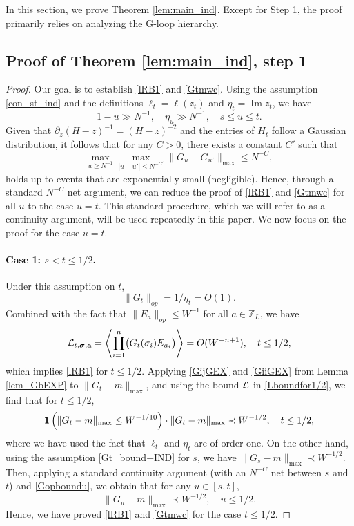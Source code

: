 \documentclass[10pt,reqno]{article}
\DeclareMathOperator{\im}{{\mathrm{Im}}}
\theoremstyle{plain} %
\theoremstyle{remark}
\numberwithin{equation}{section}
\begin{document}
In this section, we prove Theorem \ref{lem:main_ind}. Except for Step 1, the proof primarily relies on analyzing the G-loop hierarchy.

\subsection{Proof of Theorem \ref{lem:main_ind}, step 1}

\begin{proof}

Our goal is to establish \eqref{lRB1} and \eqref{Gtmwc}. Using the assumption \eqref{con_st_ind} and the definitions \(\ell_t = \ell(z_t)\) and \(\eta_t = \im z_t\), we have 
$$
1 - u \gg N^{-1}, \quad \eta_u \gg N^{-1}, \quad s\le u\le t.
$$
Given that \(\partial_z (H - z)^{-1} = (H - z)^{-2}\) and the entries of \(H_t\) follow a Gaussian distribution, it follows that for any \(C > 0\), there exists a constant \(C'\) such that 
\begin{equation}\label{Gopboundu}
    \max_{u \ge N^{-1}} \max_{|u - u'| \leq N^{-C'}} \| G_u - G_{u'} \|_{\max} \leq N^{-C},
\end{equation}
holds up to events that are exponentially small (negligible). Hence, through a standard \(N^{-C}\) net argument, we can reduce the proof of \eqref{lRB1} and \eqref{Gtmwc} for all \(u\) to the case \(u = t\). This standard procedure, which we will refer to as a continuity argument, will be used repeatedly in this paper. We now focus on the proof for the case \(u = t\).

\paragraph{Case 1: \(s < t \leq 1/2\).} 
Under this assumption on \(t\),  
$$
\|G_t\|_{op} = 1/\eta_t = O(1).
$$
Combined with the fact that \(\|E_a\|_{op} \leq W^{-1}\) for all \(a \in \mathbb{Z}_L\), we have  
\begin{equation}\label{Lboundfor1/2}
    {\cal L}_{t, \boldsymbol{\sigma}, \textbf{a}} = \left\langle \prod_{i=1}^n \bigl(G_t(\sigma_i)E_{a_i}\bigr) \right\rangle = O(W^{-n+1}), \quad t \leq 1/2, 
\end{equation}
which implies \eqref{lRB1} for \(t \leq 1/2\). Applying \eqref{GijGEX} and \eqref{GiiGEX} from Lemma \ref{lem_GbEXP} to \(\|G_t - m\|_{\max}\), and using the bound \(\cal L\) in \eqref{Lboundfor1/2}, we find that for \(t \leq 1/2\),
$$
{\bf 1}\left(\|G_t - m\|_{\max} \leq W^{-1/10}\right) \cdot \|G_t - m\|_{\max} \prec W^{-1/2}, \quad t \leq 1/2, 
$$
where we have used the fact that \(\ell_t\) and \(\eta_t\) are of order one. On the other hand, using the assumption \eqref{Gt_bound+IND} for \(s\), we have \(\|G_s - m\|_{\max} \prec W^{-1/2}\). Then, applying a standard continuity argument (with an \(N^{-C}\) net between \(s\) and \(t\)) and \eqref{Gopboundu}, we obtain that for any \(u \in [s, t]\), 
\begin{equation}\label{Gtmt12}
    \|G_u - m\|_{\max} \prec W^{-1/2}, \quad u \leq 1/2.
\end{equation}
Hence, we have proved \eqref{lRB1} and \eqref{Gtmwc} for the case \(t \leq 1/2\).


\end{proof}
\end{document}
